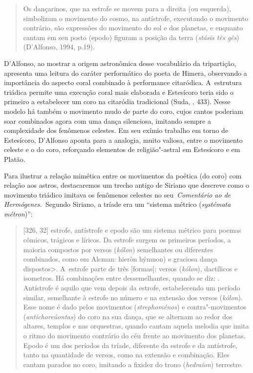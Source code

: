  

\begin{quote}
Os dançarinos, que na estrofe se movem para a direita (ou esquerda),
simbolizam o movimento do cosmo, na antístrofe, executando o movimento
contrário, são expressões do movimento do sol e dos planetas, e enquanto
cantam em seu posto (epodo) figuram a posição da terra (\emph{stásis tês
gês}) (D'Alfonso, 1994, p.19).
\end{quote}

 

D'Alfonso, ao mostrar a origem astronômica desse vocabulário da
tripartição, apresenta uma leitura do caráter performático do poeta de
Himera, observando a importância do aspecto coral combinado à
performance citaródica. A~estrutura triádica permite uma execução coral
mais elaborada e Estesícoro teria sido o primeiro a estabelecer um coro
na citaródia tradicional (Suda, , 433). Nesse modelo há também o
movimento mudo de parte do coro, cujos cantos poderiam soar combinados
agora com uma dança silenciosa, imitando sempre a complexidade dos
fenômenos celestes. Em seu exímio trabalho em torno de Estesícoro,
D'Alfonso aponta para a analogia, muito valiosa, entre o movimento
celeste e o do coro, reforçando elementos de religião"-astral em
Estesícoro e em Platão.

Para ilustrar a relação mimética entre os movimentos da poética (do
coro) com relação aos astros, destacaremos um trecho antigo de Siriano
que descreve como o movimento triádico imitava os fenômenos celestes no
seu~\emph{Comentário ao de Hermógenes.~}Segundo Siriano, a tríade era um
``sistema métrico (\emph{systémata métron})'':

 

\begin{quote}
[326, 32] estrofe, antístrofe e epodo são um sistema métrico para
poemas cômicos, trágicos e líricos. Da estrofe surgem os primeiros
períodos, a maioria compostos por versos (\emph{kólon}) semelhantes ou
diferentes combinados, como em Alcman: hieròn hýmnon) e graciosa dança
dispostos\textgreater{}. A~estrofe parte de três [formas]: versos
(\emph{kólon}), dactílicos e isometros. Há combinações entre
dessemelhantes, quando se diz: . Antístrofe é aquilo que vem depois da
estrofe, estabelecendo um período similar, semelhante à estrofe no
número e na extensão dos versos (\emph{kólon}). Esse nome é dado pelos
movimentos (\emph{strephoménos}) e contra"-movimentos
(\emph{antichoreúontas}) do coro na sua dança, que se alternam ao redor
dos altares, templos e nas orquestras, quando cantam aquela melodia que
imita o ritmo do movimento contrário do céu frente ao movimento dos
planetas. Epodo é um dos períodos da tríade, diferente da estrofe e da
antístrofe, tanto na quantidade de versos, como na extensão e
combinação. Eles cantam parados no coro, imitando a fixidez do trono
(\emph{hedraîon}) terrestre.
\end{quote}

